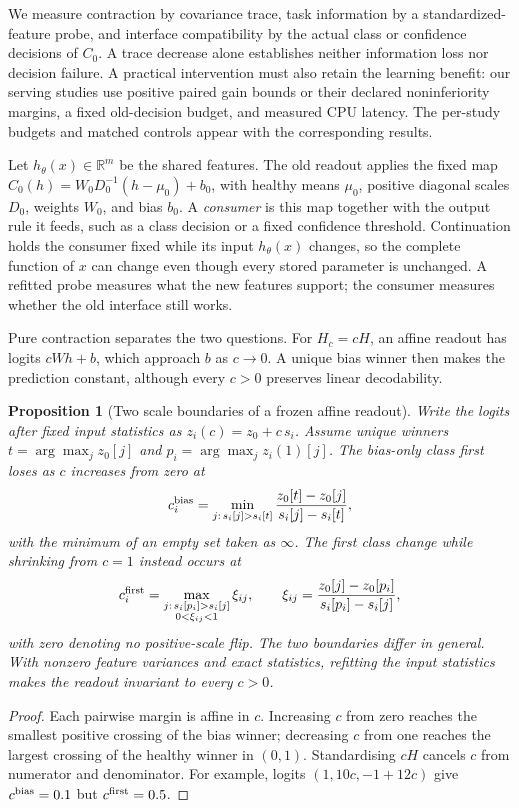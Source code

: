 \documentclass{article}
\newtheorem{proposition}{Proposition}
\begin{document}
We measure contraction by covariance trace, task information by a
standardized-feature probe, and interface compatibility by the actual
class or confidence decisions of $C_0$. A trace decrease alone establishes
neither information loss nor decision failure. A practical intervention
must also retain the learning benefit: our serving studies use positive
paired gain bounds or their declared noninferiority margins, a fixed
old-decision budget, and measured CPU latency. The per-study budgets and
matched controls appear with the corresponding results.

Let $h_\theta(x)\in\mathbb R^m$ be the shared features. The old readout applies the fixed map $C_0(h)=W_0D_0^{-1}(h-\mu_0)+b_0$, with healthy means $\mu_0$, positive diagonal scales $D_0$, weights $W_0$, and bias $b_0$. A \emph{consumer} is this map together with the output rule it feeds, such as a class decision or a fixed confidence threshold. Continuation holds the consumer fixed while its input $h_\theta(x)$ changes, so the complete function of $x$ can change even though every stored parameter is unchanged. A refitted probe measures what the new features support; the consumer measures whether the old interface still works.

Pure contraction separates the two questions. For $H_c=cH$, an affine readout has logits $cWh+b$, which approach $b$ as $c\to0$. A unique bias winner then makes the prediction constant, although every $c>0$ preserves linear decodability.

\begin{proposition}[Two scale boundaries of a frozen affine readout]\label{prop:scale_law}
Write the logits after fixed input statistics as $z_i(c)=z_0+c\,s_i$. Assume unique winners $t=\arg\max_jz_0[j]$ and $p_i=\arg\max_jz_i(1)[j]$. The bias-only class first loses as $c$ increases from zero at
\begin{equation}
 c_i^{\rm bias}=\min_{j:\,s_i[j]>s_i[t]}\frac{z_0[t]-z_0[j]}{s_i[j]-s_i[t]},
 \label{eq:critical_scale}
\end{equation}
with the minimum of an empty set taken as $\infty$. The first class change while shrinking from $c=1$ instead occurs at
\begin{equation}
 c_i^{\rm first}=\max_{\substack{j:\,s_i[p_i]>s_i[j]\\0<\xi_{ij}<1}}\xi_{ij},\qquad
 \xi_{ij}=\frac{z_0[j]-z_0[p_i]}{s_i[p_i]-s_i[j]},
 \label{eq:shrink_first}
\end{equation}
with zero denoting no positive-scale flip. The two boundaries differ in general. With nonzero feature variances and exact statistics, refitting the input statistics makes the readout invariant to every $c>0$.
\end{proposition}
\begin{proof}
Each pairwise margin is affine in $c$. Increasing $c$ from zero reaches the smallest positive crossing of the bias winner; decreasing $c$ from one reaches the largest crossing of the healthy winner in $(0,1)$. Standardising $cH$ cancels $c$ from numerator and denominator. For example, logits $(1,10c,-1+12c)$ give $c^{\rm bias}=0.1$ but $c^{\rm first}=0.5$.
\end{proof}
\end{document}
